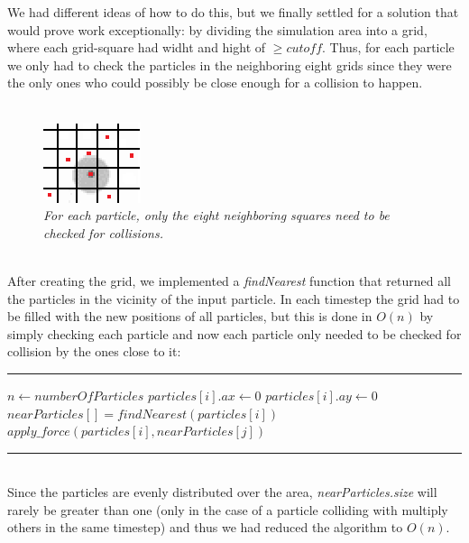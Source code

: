 \documentclass[11pt,a4paper]{article}
\begin{document}
We had different ideas of how to do this, but we finally settled for a solution that would prove work exceptionally: by dividing the simulation area into a grid, where each grid-square had widht and hight of $\geq cutoff$. Thus, for each particle we only had to check the particles in the neighboring eight grids since they were the only ones who could possibly be close enough for a collision to happen.
\\
\\
\begin{figure}[htb]
\centering
\includegraphics[scale=3]{grid.eps}
\caption{\emph{For each particle, only the eight neighboring squares need to be checked for collisions.}}
\label{fig:gird}
\end{figure}
\\
After creating the grid, we implemented a \emph{findNearest} function that returned all the particles in the vicinity of the input particle. In each timestep the grid had to be filled with the new positions of all particles, but this is done in $O(n)$ by simply checking each particle and now each particle only needed to be checked for collision by the ones close to it:
\\
\rule{125mm}{0.1pt}
\begin{algorithmic}
\STATE $n \gets numberOfParticles$
	\STATE $particles[i].ax \gets 0$
	\STATE $particles[i].ay \gets 0$
	\STATE $nearParticles[] = findNearest(particles[i])$
			\STATE $apply\_force(particles[i],nearParticles[j])$
	\ENDFOR
\ENDFOR 
\end{algorithmic}
\rule{125mm}{0.1pt}
\vspace{10pt}
\\
Since the particles are evenly distributed over the area, \emph{nearParticles.size} will rarely be greater than one (only in the case of a particle colliding with multiply others in the same timestep) and thus we had reduced the algorithm to $O(n)$.
\end{document}
